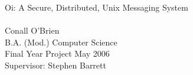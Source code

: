 
\thispagestyle{empty}

\ \vspace{8cm}

\hspace{3cm}\parbox{10cm}{
\hspace{35mm} \Huge \OghamOr \normalsize \\
\vspace{10mm} \\
Oi: A Secure, Distributed, Unix Messaging System \\
\hspace{10mm} \\
Conall O'Brien  \\
B.A. (Mod.) Computer Science \\
Final Year Project May 2006 \\ 
Supervisor: Stephen Barrett \\
}

\vfill
\pagebreak

\thispagestyle{empty}

\pagebreak
